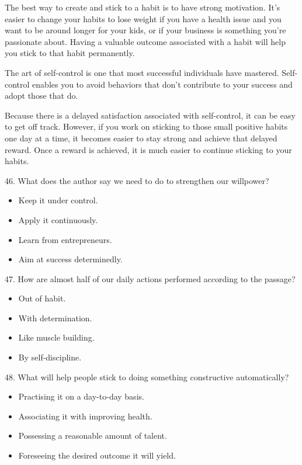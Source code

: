 \documentclass[UTF8,11pt]{ctexart}
\begin{document}
The best way to create and stick to a habit is to have strong motivation. It’s easier to change your habits to lose weight if you have a health issue and you want to be around longer for your kids, or if your business is something you’re passionate about. Having a valuable outcome associated with a habit will help you stick to that habit permanently.


The art of self-control is one that most successful individuals have mastered. Self-control enables you to avoid behaviors that don’t contribute to your success and adopt those that do.


Because there is a delayed satisfaction associated with self-control, it can be easy to get off track. However, if you work on sticking to those small positive habits one day at a time, it becomes easier to stay strong and achieve that delayed reward. Once a reward is achieved, it is much easier to continue sticking to your habits.


46. What does the author say we need to do to strengthen our willpower?


\begin{itemize}[leftmargin=2em,itemsep=.2em,topsep=.4em]\item[A.] Keep it under control.
\item[B.] Apply it continuously.
\item[C.] Learn from entrepreneurs.
\item[D.] Aim at success determinedly.
\end{itemize}

47. How are almost half of our daily actions performed according to the passage?


\begin{itemize}[leftmargin=2em,itemsep=.2em,topsep=.4em]\item[A.] Out of habit.
\item[B.] With determination.
\item[C.] Like muscle building.
\item[D.] By self-discipline.
\end{itemize}

48. What will help people stick to doing something constructive automatically?


\begin{itemize}[leftmargin=2em,itemsep=.2em,topsep=.4em]\item[A.] Practising it on a day-to-day basis.
\item[B.] Associating it with improving health.
\item[C.] Possessing a reasonable amount of talent.
\item[D.] Foreseeing the desired outcome it will yield.
\end{itemize}
\end{document}
